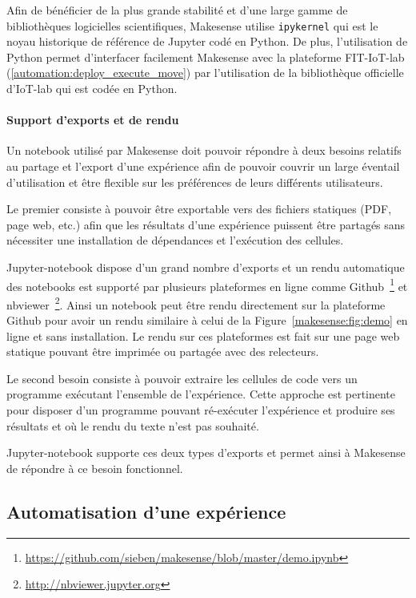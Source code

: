 Afin de bénéficier de la plus grande stabilité et d'une large gamme de bibliothèques logicielles scientifiques, Makesense utilise \texttt{ipykernel} qui est le noyau historique de référence de Jupyter codé en Python.
De plus, l'utilisation de Python permet d'interfacer facilement Makesense avec la plateforme FIT-IoT-lab (\ref{automation:deploy_execute_move}) par l'utilisation de la bibliothèque officielle d'IoT-lab qui est codée en Python.

\paragraph{Support d'exports et de rendu}

Un notebook utilisé par Makesense doit pouvoir répondre à deux besoins relatifs au partage et l'export d'une expérience afin de pouvoir couvrir un large éventail d'utilisation et être flexible sur les préférences de leurs différents utilisateurs.

Le premier consiste à pouvoir être exportable vers des fichiers statiques (\ac{PDF}, page web, etc.) afin que les résultats d'une expérience puissent être partagés sans nécessiter une installation de dépendances et l'exécution des cellules.

Jupyter-notebook dispose d'un grand nombre d'exports et un rendu automatique des notebooks est supporté par plusieurs plateformes en ligne comme Github~\footnote{\href{https://github.com/sieben/makesense/blob/master/demo.ipynb}{https://github.com/sieben/makesense/blob/master/demo.ipynb}} et nbviewer~\footnote{\href{http://nbviewer.jupyter.org/}{http://nbviewer.jupyter.org}}.
Ainsi un notebook peut être rendu directement sur la plateforme Github pour avoir un rendu similaire à celui de la Figure~\ref{makesense:fig:demo} en ligne et sans installation.
Le rendu sur ces plateformes est fait sur une page web statique pouvant être imprimée ou partagée avec des relecteurs.

Le second besoin consiste à pouvoir extraire les cellules de code vers un programme exécutant l'ensemble de l'expérience.
Cette approche est pertinente pour disposer d'un programme pouvant ré-exécuter l'expérience et produire ses résultats et où le rendu du texte n'est pas souhaité.

Jupyter-notebook supporte ces deux types d'exports et permet ainsi à Makesense de répondre à ce besoin fonctionnel.

\subsection{Automatisation d'une expérience}
\label{makesense:auto}

